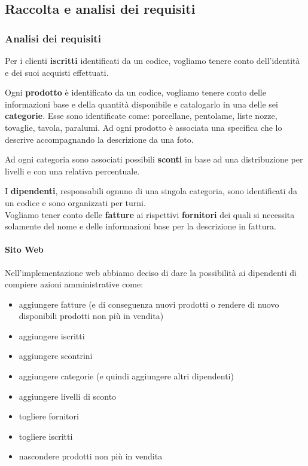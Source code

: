 \subsection{Raccolta e analisi dei requisiti}

\subsubsection{Analisi dei requisiti}
Per i clienti \textbf{iscritti} identificati da un codice, vogliamo tenere conto dell'identit\`a e dei suoi acquisti effettuati.



Ogni \textbf{prodotto} \`e identificato da un codice, vogliamo tenere conto delle informazioni base e della quantit\`a disponibile e catalogarlo in una delle sei \textbf{categorie}. Esse sono identificate come: porcellane, pentolame, liste nozze, tovaglie, tavola, paralumi. Ad ogni prodotto \`e associata una specifica che lo descrive accompagnando la descrizione da una foto.


Ad ogni categoria sono associati possibili \textbf{sconti} in base ad una distribuzione per livelli e con una relativa percentuale.


I \textbf{dipendenti}, responsabili ognuno di una singola categoria, sono identificati da un codice e sono organizzati per turni. \\

Vogliamo tener conto delle \textbf{fatture} ai rispettivi \textbf{fornitori} dei quali si necessita solamente del nome e delle informazioni base per la descrizione in fattura.

\paragraph*{Sito Web} Nell'implementazione web abbiamo deciso di dare la possibilit\`a ai dipendenti di compiere azioni amministrative come:
\begin{itemize}
\item aggiungere fatture (e di conseguenza nuovi prodotti o rendere di nuovo disponibili prodotti non pi\`u in vendita)
\item aggiungere iscritti
\item aggiungere scontrini
\item aggiungere categorie (e quindi aggiungere altri dipendenti)
\item aggiungere livelli di sconto
\item togliere fornitori
\item togliere iscritti
\item nascondere prodotti non pi\`u in vendita
\end{itemize}

